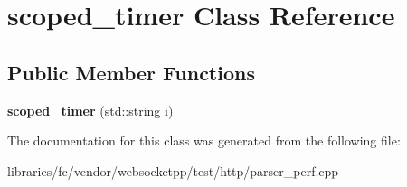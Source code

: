 \hypertarget{classscoped__timer}{}\section{scoped\+\_\+timer Class Reference}
\label{classscoped__timer}
\subsection*{Public Member Functions}
\begin{DoxyCompactItemize}
\item 
\mbox{\label{classscoped__timer_af0b177ccdf9f0d371548c47bbee73f9b}} 
{\bfseries scoped\+\_\+timer} (std\+::string i)
\end{DoxyCompactItemize}


The documentation for this class was generated from the following file\+:\begin{DoxyCompactItemize}
\item 
libraries/fc/vendor/websocketpp/test/http/parser\+\_\+perf.\+cpp\end{DoxyCompactItemize}
